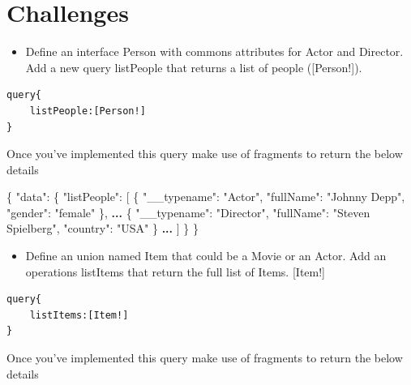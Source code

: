 \documentclass[]{book}
\newenvironment{Shaded}{\begin{snugshade}}{\end{snugshade}}
\newcommand{\DataTypeTok}[1]{\textcolor[rgb]{0.13,0.29,0.53}{#1}}
\newcommand{\StringTok}[1]{\textcolor[rgb]{0.31,0.60,0.02}{#1}}
\newcommand{\OtherTok}[1]{\textcolor[rgb]{0.56,0.35,0.01}{#1}}
\newcommand{\FunctionTok}[1]{\textcolor[rgb]{0.00,0.00,0.00}{#1}}
\newcommand{\ErrorTok}[1]{\textcolor[rgb]{0.64,0.00,0.00}{\textbf{#1}}}
\providecommand{\tightlist}{%
  \setlength{\itemsep}{0pt}\setlength{\parskip}{0pt}}
\begin{document}
\section{Challenges}\label{challenges-3}

\begin{itemize}
\tightlist
\item
  Define an interface Person with commons attributes for Actor and
  Director. Add a new query listPeople that returns a list of people
  ({[}Person!{]}).
\end{itemize}

\begin{verbatim}
query{
    listPeople:[Person!]
}
\end{verbatim}

Once you've implemented this query make use of fragments to return the
below details

\begin{Shaded}
\begin{Highlighting}[]
\FunctionTok{\{}
  \DataTypeTok{"data"}\FunctionTok{:} \FunctionTok{\{}
    \DataTypeTok{"listPeople"}\FunctionTok{:} \OtherTok{[}
      \FunctionTok{\{}
        \DataTypeTok{"__typename"}\FunctionTok{:} \StringTok{"Actor"}\FunctionTok{,}
        \DataTypeTok{"fullName"}\FunctionTok{:} \StringTok{"Johnny Depp"}\FunctionTok{,}
        \DataTypeTok{"gender"}\FunctionTok{:} \StringTok{"female"}
      \FunctionTok{\}}\OtherTok{,}
      \ErrorTok{...}
      \FunctionTok{\{}
          \DataTypeTok{"__typename"}\FunctionTok{:} \StringTok{"Director"}\FunctionTok{,}
          \DataTypeTok{"fullName"}\FunctionTok{:} \StringTok{"Steven Spielberg"}\FunctionTok{,}
          \DataTypeTok{"country"}\FunctionTok{:} \StringTok{"USA"}
       \FunctionTok{\}}
       \ErrorTok{...}
    \OtherTok{]}
  \FunctionTok{\}}
\FunctionTok{\}}
\end{Highlighting}
\end{Shaded}

\begin{itemize}
\tightlist
\item
  Define an union named Item that could be a Movie or an Actor. Add an
  operations listItems that return the full list of Items. {[}Item!{]}
\end{itemize}

\begin{verbatim}
query{
    listItems:[Item!]
}
\end{verbatim}

Once you've implemented this query make use of fragments to return the
below details
\end{document}
